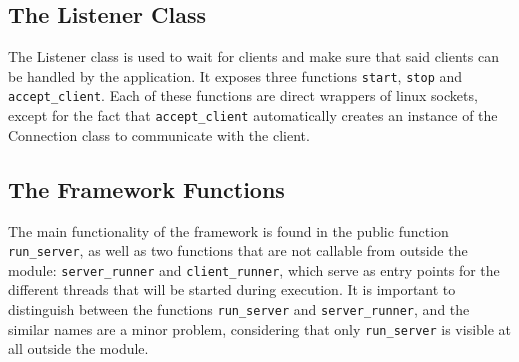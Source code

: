 

\subsection{The Listener Class}

The Listener class is used to wait for clients and make sure that said clients can be handled by the application. It exposes three functions \lstinline|start|, \lstinline|stop| and \lstinline|accept_client|.
Each of these functions are direct wrappers of linux sockets, except for the fact that \lstinline|accept_client| automatically creates an instance of the Connection class to communicate with
the client.

\subsection{The Framework Functions}

The main functionality of the framework is found in the public function \lstinline|run_server|, as well as two functions that are not callable from outside the module:
\lstinline|server_runner| and \lstinline|client_runner|, which serve as entry points for the different threads that will be started during execution.
It is important to distinguish between the functions \lstinline|run_server| and \lstinline|server_runner|, and the similar names are a minor problem,
considering that only \lstinline|run_server| is visible at all outside the module.

